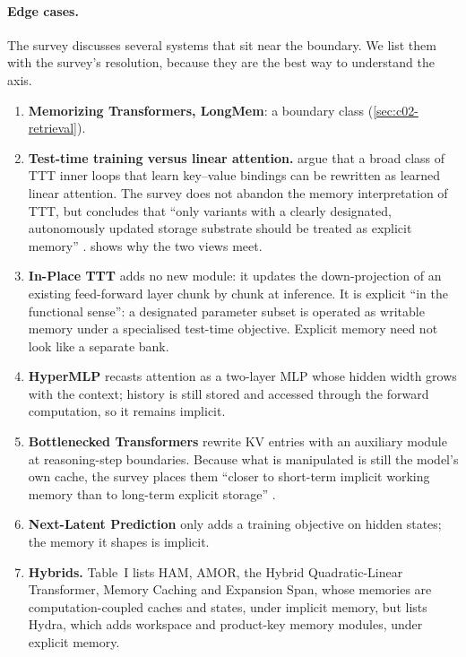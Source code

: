 \paragraph{Edge cases.} The survey discusses several systems that sit near the boundary. We list
them with the survey's resolution, because they are the best way to understand the axis.
\begin{enumerate}
  \item \textbf{Memorizing Transformers, LongMem}: a boundary class (\cref{sec:c02-retrieval}).
  \item \textbf{Test-time training versus linear attention.} \citet{liu2026tttla} argue that a
        broad class of TTT inner loops that learn key--value bindings can be rewritten as learned
        linear attention. The survey does not abandon the memory interpretation of TTT, but
        concludes that ``only variants with a clearly designated, autonomously updated storage
        substrate should be treated as explicit memory'' \citep[\S IV-A]{zhoubian2026memory}.
         shows why the two views meet.
  \item \textbf{In-Place TTT} \citep{feng2026inplacettt} adds no new module: it updates the
        down-projection of an existing feed-forward layer chunk by chunk at inference. It is
        explicit ``in the functional sense'': a designated parameter subset is operated as
        writable memory under a specialised test-time objective. Explicit memory need not look
        like a separate bank.
  \item \textbf{HyperMLP} \citep{lu2026hypermlp} recasts attention as a two-layer MLP whose hidden
        width grows with the context; history is still stored and accessed through the forward
        computation, so it remains implicit.
  \item \textbf{Bottlenecked Transformers} \citep{oomerjee2026bottlenecked} rewrite KV entries with
        an auxiliary module at reasoning-step boundaries. Because what is manipulated is still the
        model's own cache, the survey places them ``closer to short-term implicit working memory
        than to long-term explicit storage'' \citep[\S V-B]{zhoubian2026memory}.
  \item \textbf{Next-Latent Prediction} \citep{teoh2026nextlat} only adds a training objective on hidden
        states; the memory it shapes is implicit.
  \item \textbf{Hybrids.} Table~I lists HAM, AMOR, the Hybrid Quadratic-Linear Transformer,
        Memory Caching and Expansion Span, whose memories are computation-coupled caches and
        states, under implicit memory, but lists Hydra, which adds workspace and product-key
        memory modules, under explicit memory.
\end{enumerate}


